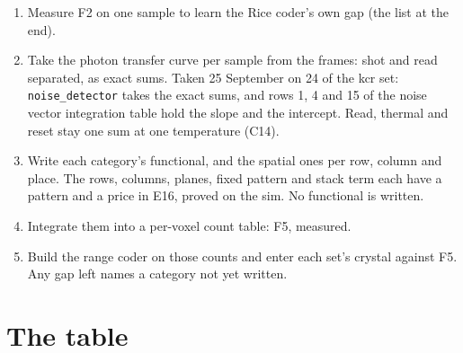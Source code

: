 \begin{enumerate}
\item Measure F2 on one sample to learn the Rice coder's own gap (the list at the end).
\item Take the photon transfer curve per sample from the frames: shot and read separated, as exact sums. Taken 25 September on 24 of the kcr set: \texttt{noise\_\allowbreak{}detector} takes the exact sums, and rows 1, 4 and 15 of the noise vector integration table hold the slope and the intercept. Read, thermal and reset stay one sum at one temperature (C14).
\item Write each category's functional, and the spatial ones per row, column and place. The rows, columns, planes, fixed pattern and stack term each have a pattern and a price in E16, proved on the sim. No functional is written.
\item Integrate them into a per-voxel count table: F5, measured.
\item Build the range coder on those counts and enter each set's crystal against F5. Any gap left names a category not yet written.
\end{enumerate}

\section{\texorpdfstring{The table}{The table}}

